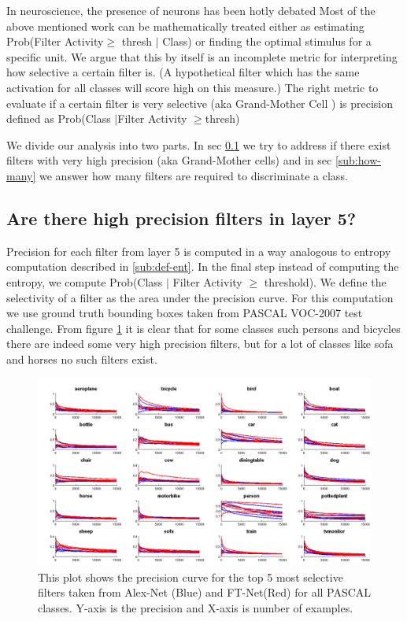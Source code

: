 \documentclass[runningheads]{llncs}
\begin{document}
In neuroscience, the presence of neurons  has been hotly debated Most of the above mentioned work can be mathematically treated either as estimating Prob(Filter Activity$\geq$ thresh $|$ Class) or finding the optimal stimulus for a specific unit. We argue that this by itself is an incomplete metric for interpreting how selective a certain filter is. (A hypothetical filter which has the same activation for all classes will score high on this measure.)  The right metric to evaluate if a certain filter is very selective (aka Grand-Mother Cell \cite{Barlow}) is precision defined as Prob(Class $|$Filter Activity $\geq$thresh)

We divide our analysis into two parts. In sec \ref{sub:class-specific-unit} we try to address if there exist filters with very high precision (aka Grand-Mother cells) and in sec \ref{sub:how-many} we answer how many filters are required to discriminate a class. 

\subsection{Are there high precision filters in layer 5?}
\label{sub:class-specific-unit}
Precision for each filter from layer 5 is computed in a way analogous to entropy computation described in \ref{sub:def-ent}. In the final step instead of computing the entropy, we compute Prob(Class $|$ Filter Activity $\geq$ threshold). We define the selectivity of a filter as the area under the precision curve. For this computation we use ground truth bounding boxes taken from PASCAL VOC-2007 test challenge.
From figure \ref{fig:prob-sel} it is clear that for some classes such persons and bicycles there are indeed some very high precision filters, but for a lot of classes like sofa and horses no such filters exist. 

\begin{figure}[t!]
\centering
\includegraphics[scale=0.20]{images/prob_sel_dims_top5.png}
\caption{This plot shows the precision curve for the top 5 most selective filters taken from Alex-Net (Blue) and FT-Net(Red) for all PASCAL classes. Y-axis is the precision and X-axis is number of examples.}
\label{fig:prob-sel}
\end{figure}
\end{document}
